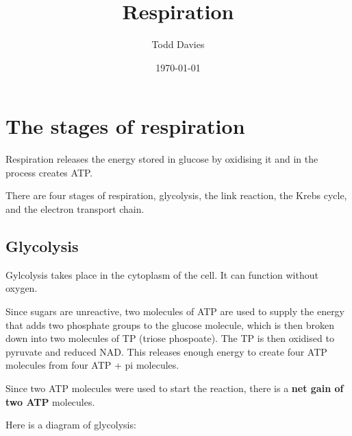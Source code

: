 \documentclass{article}
\title{Respiration}
\author{Todd Davies}
\date{\today}
\begin{document}
\lhead{\today}

\maketitle

\section*{The stages of respiration}
\thispagestyle{empty}
Respiration releases the energy stored in glucose by oxidising it and in the
process creates ATP.

There are four stages of respiration, glycolysis, the link reaction, the Krebs
cycle, and the electron transport chain.

\subsection*{Glycolysis}
Gylcolysis takes place in the cytoplasm of the cell. It can function without
oxygen.

Since sugars are unreactive, two molecules of ATP are used to supply the energy
that adds two phosphate groups to the glucose molecule, which is then broken
down into two molecules of TP (triose phospoate). The TP is then oxidised to
pyruvate and reduced NAD. This releases enough energy to create four ATP
molecules from four ATP + pi molecules.

Since two ATP molecules were used to start the reaction, there is a
\textbf{net gain of two ATP} molecules.

Here is a diagram of glycolysis:

\begin{center}
\end{center}
\end{document}
